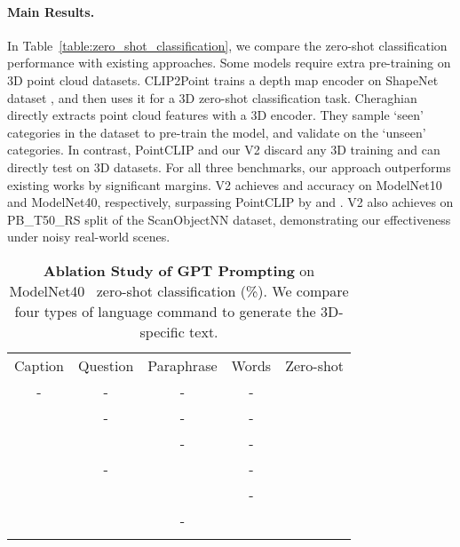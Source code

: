 \documentclass[10pt,twocolumn,letterpaper]{article}
\begin{document}
\vspace{-0.2cm}
\paragraph{Main Results.} In Table~\ref{table:zero_shot_classification}, we compare the zero-shot classification performance with existing approaches.
Some models require extra pre-training on 3D point cloud datasets. CLIP2Point trains a depth map encoder on ShapeNet dataset \cite{chang2015shapenet}, and then uses it for a 3D zero-shot classification task. Cheraghian \etal \cite{cheraghian2022zero} directly extracts point cloud features with a 3D encoder. They sample `seen' categories in the dataset to pre-train the model, and validate on the `unseen' categories. In contrast, PointCLIP and our V2 discard any 3D training and can directly test on 3D datasets.
For all three benchmarks, our approach outperforms existing works by significant margins. V2 achieves  and  accuracy on ModelNet10 and ModelNet40, respectively, surpassing PointCLIP by  and . V2 also achieves  on PB\_T50\_RS split of the ScanObjectNN dataset, demonstrating our effectiveness under noisy real-world scenes.

\begin{table}[t!]
\centering
\begin{adjustbox}{width=0.91\linewidth}
	\begin{tabular}{ccccc}
	\toprule
		Caption & Question & Paraphrase & Words & Zero-shot \\ \cmidrule(lr){1-5}
		- & - & - & - & \\
		\checkmark & - & - & - & \\
		\checkmark & \checkmark & - & - & \\
		\checkmark & - & \checkmark & - & \\
		\checkmark & \checkmark & \checkmark & - & \\
		\checkmark & \checkmark & - & \checkmark & \\ 
		\checkmark & \checkmark & \checkmark & \checkmark &  \\ 
	\bottomrule
	\end{tabular}
\end{adjustbox}
\vspace{0.2cm}
\caption{\textbf{Ablation Study of GPT Prompting} on ModelNet40~\cite{wu20153d} zero-shot classification (\%). We compare four types of language command to generate the 3D-specific text.}
\vspace*{-5pt}
\label{table:ablation_commands}
\end{table}
\end{document}
